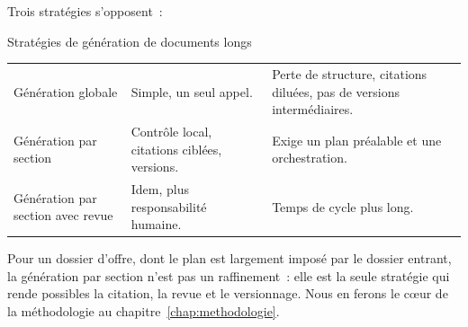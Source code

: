 Trois stratégies s'opposent~:

\begin{btptable}{Stratégies de génération de documents longs}
\label{tab:strategies-generation}
\begin{tabularx}{\linewidth}{@{}L{3.6cm} Y Y@{}}
\toprule
{}
 &  &  \\
\midrule
Génération globale & Simple, un seul appel. & Perte de structure, citations diluées, pas de versions intermédiaires. \\
Génération par section & Contrôle local, citations ciblées, versions. & Exige un plan préalable et une orchestration. \\
Génération par section avec revue & Idem, plus responsabilité humaine. & Temps de cycle plus long. \\
\bottomrule
\end{tabularx}
\end{btptable}

Pour un dossier d'offre, dont le plan est largement imposé par le dossier
entrant, la génération par section n'est pas un raffinement~: elle est la
seule stratégie qui rende possibles la citation, la revue et le versionnage.
Nous en ferons le c\oe ur de la méthodologie au chapitre~\ref{chap:methodologie}.
